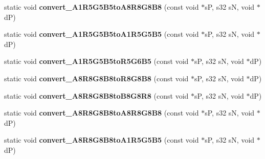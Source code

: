 \begin{DoxyCompactItemize}
\item 
\hypertarget{classirr_1_1video_1_1_c_color_converter_a148e795c52eddf8fdc03a1ab862ef74e}{static void {\bfseries convert\-\_\-\-A1\-R5\-G5\-B5to\-A8\-R8\-G8\-B8} (const void $\ast$s\-P, s32 s\-N, void $\ast$d\-P)}\label{classirr_1_1video_1_1_c_color_converter_a148e795c52eddf8fdc03a1ab862ef74e}

\item 
\hypertarget{classirr_1_1video_1_1_c_color_converter_a1d7fa13bc956b865f196d987f1504743}{static void {\bfseries convert\-\_\-\-A1\-R5\-G5\-B5to\-A1\-R5\-G5\-B5} (const void $\ast$s\-P, s32 s\-N, void $\ast$d\-P)}\label{classirr_1_1video_1_1_c_color_converter_a1d7fa13bc956b865f196d987f1504743}

\item 
\hypertarget{classirr_1_1video_1_1_c_color_converter_af7d97bf7696346151932d9ac1e6dcbe1}{static void {\bfseries convert\-\_\-\-A1\-R5\-G5\-B5to\-R5\-G6\-B5} (const void $\ast$s\-P, s32 s\-N, void $\ast$d\-P)}\label{classirr_1_1video_1_1_c_color_converter_af7d97bf7696346151932d9ac1e6dcbe1}

\item 
\hypertarget{classirr_1_1video_1_1_c_color_converter_ae4d59dbcb03576adb8851452f31ec2f2}{static void {\bfseries convert\-\_\-\-A8\-R8\-G8\-B8to\-R8\-G8\-B8} (const void $\ast$s\-P, s32 s\-N, void $\ast$d\-P)}\label{classirr_1_1video_1_1_c_color_converter_ae4d59dbcb03576adb8851452f31ec2f2}

\item 
\hypertarget{classirr_1_1video_1_1_c_color_converter_af6a9c6ca2905b6ee5450acc588479825}{static void {\bfseries convert\-\_\-\-A8\-R8\-G8\-B8to\-B8\-G8\-R8} (const void $\ast$s\-P, s32 s\-N, void $\ast$d\-P)}\label{classirr_1_1video_1_1_c_color_converter_af6a9c6ca2905b6ee5450acc588479825}

\item 
\hypertarget{classirr_1_1video_1_1_c_color_converter_a9aeba2990bae1723981416ee860e5029}{static void {\bfseries convert\-\_\-\-A8\-R8\-G8\-B8to\-A8\-R8\-G8\-B8} (const void $\ast$s\-P, s32 s\-N, void $\ast$d\-P)}\label{classirr_1_1video_1_1_c_color_converter_a9aeba2990bae1723981416ee860e5029}

\item 
\hypertarget{classirr_1_1video_1_1_c_color_converter_a377bf92b7da4c745a8f91a3a8eb3b7b4}{static void {\bfseries convert\-\_\-\-A8\-R8\-G8\-B8to\-A1\-R5\-G5\-B5} (const void $\ast$s\-P, s32 s\-N, void $\ast$d\-P)}\label{classirr_1_1video_1_1_c_color_converter_a377bf92b7da4c745a8f91a3a8eb3b7b4}


\end{DoxyCompactItemize}
